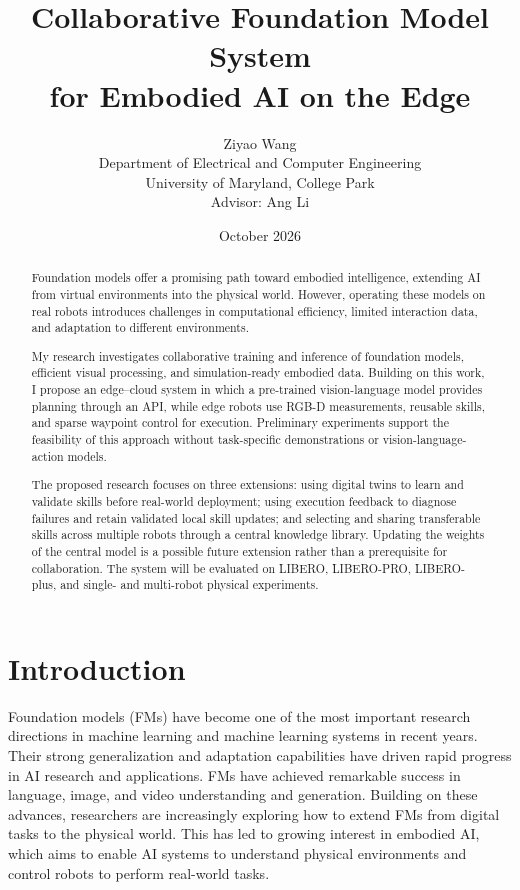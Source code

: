 \documentclass[11pt]{article}
\title{Collaborative Foundation Model System\\
for Embodied AI on the Edge}
\author{Ziyao Wang\\
Department of Electrical and Computer Engineering\\
University of Maryland, College Park\\[0.3em]
Advisor: Ang Li}
\date{October 2026}
\begin{document}
\maketitle

\begin{abstract}
Foundation models offer a promising path toward embodied intelligence, extending AI from virtual environments into the physical world. However, operating these models on real robots introduces challenges in computational efficiency, limited interaction data, and adaptation to different environments.

My research investigates collaborative training and inference of foundation models, efficient visual processing, and simulation-ready embodied data. Building on this work, I propose an edge--cloud system in which a pre-trained vision-language model provides planning through an API, while edge robots use RGB-D measurements, reusable skills, and sparse waypoint control for execution. Preliminary experiments support the feasibility of this approach without task-specific demonstrations or vision-language-action models.

The proposed research focuses on three extensions: using digital twins to learn and validate skills before real-world deployment; using execution feedback to diagnose failures and retain validated local skill updates; and selecting and sharing transferable skills across multiple robots through a central knowledge library. Updating the weights of the central model is a possible future extension rather than a prerequisite for collaboration. The system will be evaluated on LIBERO, LIBERO-PRO, LIBERO-plus, and single- and multi-robot physical experiments.
\end{abstract}


\section{Introduction}
\label{sec:introduction}

Foundation models (FMs) have become one of the most important research directions in machine learning and machine learning systems in recent years. Their strong generalization and adaptation capabilities have driven rapid progress in AI research and applications. FMs have achieved remarkable success in language, image, and video understanding and generation. Building on these advances, researchers are increasingly exploring how to extend FMs from digital tasks to the physical world. This has led to growing interest in embodied AI, which aims to enable AI systems to understand physical environments and control robots to perform real-world tasks.
\end{document}
